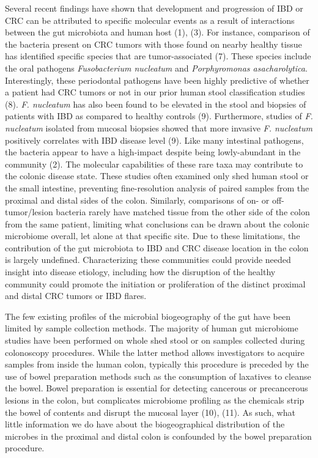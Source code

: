 \documentclass[11pt,]{article}
\begin{document}
Several recent findings have shown that development and progression of
IBD or CRC can be attributed to specific molecular events as a result of
interactions between the gut microbiota and human host (1), (3). For
instance, comparison of the bacteria present on CRC tumors with those
found on nearby healthy tissue has identified specific species that are
tumor-associated (7). These species include the oral pathogens
\emph{Fusobacterium nucleatum} and \emph{Porphyromonas asacharolytica}.
Interestingly, these periodontal pathogens have been highly predictive
of whether a patient had CRC tumors or not in our prior human stool
classification studies (8). \emph{F. nucleatum} has also been found to
be elevated in the stool and biopsies of patients with IBD as compared
to healthy controls (9). Furthermore, studies of \emph{F. nucleatum}
isolated from mucosal biopsies showed that more invasive \emph{F.
nucleatum} positively correlates with IBD disease level (9). Like many
intestinal pathogens, the bacteria appear to have a high-impact despite
being lowly-abundant in the community (2). The molecular capabilities of
these rare taxa may contribute to the colonic disease state. These
studies often examined only shed human stool or the small intestine,
preventing fine-resolution analysis of paired samples from the proximal
and distal sides of the colon. Similarly, comparisons of on- or
off-tumor/lesion bacteria rarely have matched tissue from the other side
of the colon from the same patient, limiting what conclusions can be
drawn about the colonic microbiome overall, let alone at that specific
site. Due to these limitations, the contribution of the gut microbiota
to IBD and CRC disease location in the colon is largely undefined.
Characterizing these communities could provide needed insight into
disease etiology, including how the disruption of the healthy community
could promote the initiation or proliferation of the distinct proximal
and distal CRC tumors or IBD flares.

The few existing profiles of the microbial biogeography of the gut have
been limited by sample collection methods. The majority of human gut
microbiome studies have been performed on whole shed stool or on samples
collected during colonoscopy procedures. While the latter method allows
investigators to acquire samples from inside the human colon, typically
this procedure is preceded by the use of bowel preparation methods such
as the consumption of laxatives to cleanse the bowel. Bowel preparation
is essential for detecting cancerous or precancerous lesions in the
colon, but complicates microbiome profiling as the chemicals strip the
bowel of contents and disrupt the mucosal layer (10), (11). As such,
what little information we do have about the biogeographical
distribution of the microbes in the proximal and distal colon is
confounded by the bowel preparation procedure.
\end{document}
